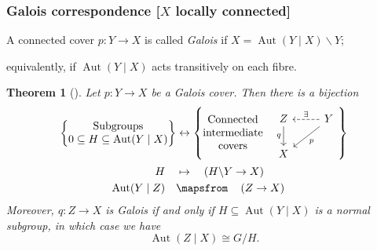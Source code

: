 \documentclass[notheorems, hyperref={backref}]{beamer}
\newtheorem*{thm}{Theorem}
\DeclareMathOperator{\Aut}{Aut}
\begin{document}
\begin{frame}
    \frametitle{Galois correspondence [$X$ locally connected]}
    A connected cover $p\colon Y\to X$ is called \textit{Galois} if $X=\Aut(Y\mid X)\backslash Y$;
    \pause

    equivalently, if $\Aut(Y\mid X)$ acts transitively on each fibre.
    \pause

    \begin{thm}[{\cite[Theorem 2.2.10]{sza08}}]
	Let $p\colon Y\to X$ be a Galois cover.
	Then there is a bijection
	\begin{align*}
	    \left\{ \begin{matrix*}
		\mathrm{ Subgroups } \\
	    0\subseteq H\subseteq \Aut(Y\mid X)
	    \end{matrix*} \right\} & \leftrightarrow \left\{ \begin{matrix*}
		\mathrm{Connected} \\
		\mathrm{intermediate} \\
		\mathrm{covers}
	    \end{matrix*} 
	    \quad
	    \begin{tikzcd}[ampersand replacement=\&]
		Z\arrow[swap]{d}{q} \& Y\arrow{dl}{p}\arrow[dashed, swap]{l}{\exists} \\
		X \&
	    \end{tikzcd}
	    \right\} \\
	    H \quad  & \mapsto	\quad \left( H\backslash Y\to X\right) \\
	    \Aut(Y\mid Z) \quad & \mapsfrom \quad \left( Z\to X\right)
	\end{align*}
	\pause
	Moreover, $q\colon Z\to X$ is Galois if and only if $H\subseteq \Aut(Y\mid X)$ is a normal subgroup, in which case we have
	\[ \Aut(Z\mid X)\cong G/H . \]
    \end{thm}
\end{frame}
\end{document}
